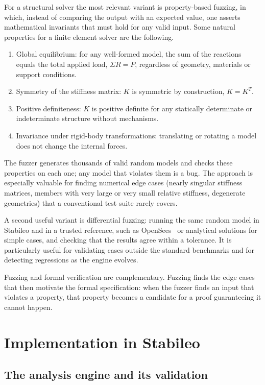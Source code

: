 \documentclass[11pt,a4paper]{article}
\begin{document}
For a structural solver the most relevant variant is property-based fuzzing, in which, instead of comparing the output with an expected value, one asserts mathematical invariants that must hold for any valid input. Some natural properties for a finite element solver are the following.

\begin{enumerate}
  \item Global equilibrium: for any well-formed model, the sum of the reactions equals the total applied load, $\Sigma R = P$, regardless of geometry, materials or support conditions.
  \item Symmetry of the stiffness matrix: $K$ is symmetric by construction, $K = K^T$.
  \item Positive definiteness: $K$ is positive definite for any statically determinate or indeterminate structure without mechanisms.
  \item Invariance under rigid-body transformations: translating or rotating a model does not change the internal forces.
\end{enumerate}

The fuzzer generates thousands of valid random models and checks these properties on each one; any model that violates them is a bug. The approach is especially valuable for finding numerical edge cases (nearly singular stiffness matrices, members with very large or very small relative stiffness, degenerate geometries) that a conventional test suite rarely covers.

A second useful variant is differential fuzzing: running the same random model in Stabileo and in a trusted reference, such as OpenSees~\cite{ref2} or analytical solutions for simple cases, and checking that the results agree within a tolerance. It is particularly useful for validating cases outside the standard benchmarks and for detecting regressions as the engine evolves.

Fuzzing and formal verification are complementary. Fuzzing finds the edge cases that then motivate the formal specification: when the fuzzer finds an input that violates a property, that property becomes a candidate for a proof guaranteeing it cannot happen.

\section{Implementation in Stabileo}\label{sec:5}

\subsection{The analysis engine and its validation}\label{sec:5.1}
\end{document}
